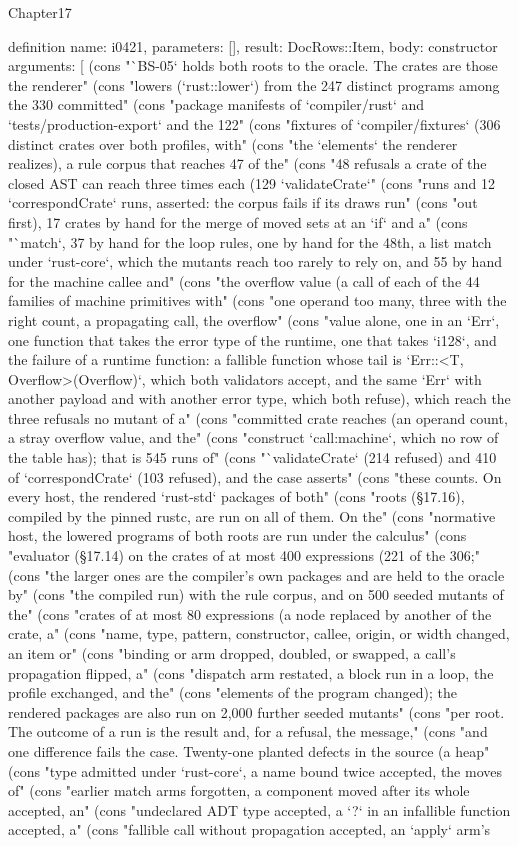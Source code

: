 \begin{lexlean}{Chapter17}
\begin{semanticmodule}
definition{
  name: i0421,
  parameters: [],
  result: DocRows::Item,
  body: constructor{
    arguments: [
      (cons "`BS-05` holds both roots to the oracle. The crates are those the renderer" (cons "lowers (`rust::lower`) from the 247 distinct programs among the 330 committed" (cons "package manifests of `compiler/rust` and `tests/production-export` and the 122" (cons "fixtures of `compiler/fixtures` (306 distinct crates over both profiles, with" (cons "the `elements` the renderer realizes), a rule corpus that reaches 47 of the" (cons "48 refusals a crate of the closed AST can reach three times each (129 `validateCrate`" (cons "runs and 12 `correspondCrate` runs, asserted: the corpus fails if its draws run" (cons "out first), 17 crates by hand for the merge of moved sets at an `if` and a" (cons "`match`, 37 by hand for the loop rules, one by hand for the 48th, a list match under `rust-core`, which the mutants reach too rarely to rely on, and 55 by hand for the machine callee and" (cons "the overflow value (a call of each of the 44 families of machine primitives with" (cons "one operand too many, three with the right count, a propagating call, the overflow" (cons "value alone, one in an `Err`, one function that takes the error type of the runtime, one that takes `i128`, and the failure of a runtime function: a fallible function whose tail is `Err::<T, Overflow>(Overflow)`, which both validators accept, and the same `Err` with another payload and with another error type, which both refuse), which reach the three refusals no mutant of a" (cons "committed crate reaches (an operand count, a stray overflow value, and the" (cons "construct `call:machine`, which no row of the table has); that is 545 runs of" (cons "`validateCrate` (214 refused) and 410 of `correspondCrate` (103 refused), and the case asserts" (cons "these counts. On every host, the rendered `rust-std` packages of both" (cons "roots (§17.16), compiled by the pinned rustc, are run on all of them. On the" (cons "normative host, the lowered programs of both roots are run under the calculus" (cons "evaluator (§17.14) on the crates of at most 400 expressions (221 of the 306;" (cons "the larger ones are the compiler's own packages and are held to the oracle by" (cons "the compiled run) with the rule corpus, and on 500 seeded mutants of the" (cons "crates of at most 80 expressions (a node replaced by another of the crate, a" (cons "name, type, pattern, constructor, callee, origin, or width changed, an item or" (cons "binding or arm dropped, doubled, or swapped, a call's propagation flipped, a" (cons "dispatch arm restated, a block run in a loop, the profile exchanged, and the" (cons "elements of the program changed); the rendered packages are also run on 2,000 further seeded mutants" (cons "per root. The outcome of a run is the result and, for a refusal, the message," (cons "and one difference fails the case. Twenty-one planted defects in the source (a heap" (cons "type admitted under `rust-core`, a name bound twice accepted, the moves of" (cons "earlier match arms forgotten, a component moved after its whole accepted, an" (cons "undeclared ADT type accepted, a `?` in an infallible function accepted, a" (cons "fallible call without propagation accepted, an `apply` arm's }}
\end{semanticmodule}
\end{lexlean}
